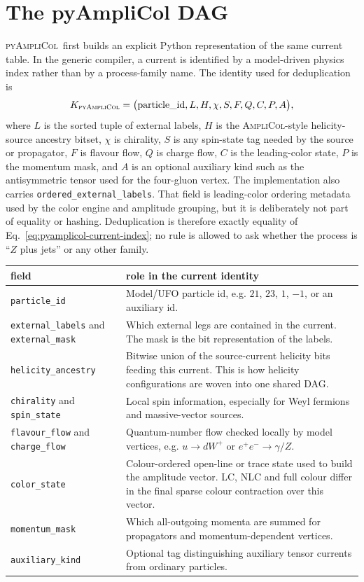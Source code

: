 \documentclass[10pt]{article}
\newcommand{\AC}{\textsc{AmpliCol}}
\newcommand{\PAC}{\textsc{pyAmpliCol}}
\begin{document}
\section{The pyAmpliCol DAG}

\PAC\ first builds an explicit Python representation of the same current table.
In the generic compiler, a current is identified by a model-driven physics
index rather than by a process-family name.  The identity used for
deduplication is
\begin{equation}
  K_{\PAC} =
  \bigl(
    \mathrm{particle\_id}, L, H, \chi, S, F, Q, C, P, A
  \bigr),
  \label{eq:pyamplicol-current-index}
\end{equation}
where $L$ is the sorted tuple of external labels, $H$ is the
\AC-style helicity-source ancestry bitset, $\chi$ is chirality, $S$ is any
spin-state tag needed by the source or propagator, $F$ is flavour flow, $Q$ is
charge flow, $C$ is the leading-color state, $P$ is the momentum mask, and $A$
is an optional auxiliary kind such as the antisymmetric tensor used for the
four-gluon vertex.  The implementation also carries
\texttt{ordered\_external\_labels}.  That field is leading-color ordering
metadata used by the color engine and amplitude grouping, but it is deliberately
not part of equality or hashing.  Deduplication is therefore exactly equality
of Eq.~\eqref{eq:pyamplicol-current-index}; no rule is allowed to ask whether
the process is ``$Z$ plus jets'' or any other family.

\begin{center}
\begin{tabular}{@{}L{1.45in}L{4.95in}@{}}
\toprule
\textbf{field} & \textbf{role in the current identity} \\
\midrule
\texttt{particle\_id} & Model/UFO particle id, e.g. $21$, $23$, $1$, $-1$, or an auxiliary id. \\
\texttt{external\_labels} and \texttt{external\_mask} & Which external legs are contained in the current.  The mask is the bit representation of the labels. \\
\texttt{helicity\_ancestry} & Bitwise union of the source-current helicity bits feeding this current.  This is how helicity configurations are woven into one shared DAG. \\
\texttt{chirality} and \texttt{spin\_state} & Local spin information, especially for Weyl fermions and massive-vector sources. \\
\texttt{flavour\_flow} and \texttt{charge\_flow} & Quantum-number flow checked locally by model vertices, e.g. $u\to d W^+$ or $e^+e^-\to\gamma/Z$. \\
\texttt{color\_state} & Colour-ordered open-line or trace state used to build the amplitude vector.  LC, NLC and full colour differ in the final sparse colour contraction over this vector. \\
\texttt{momentum\_mask} & Which all-outgoing momenta are summed for propagators and momentum-dependent vertices. \\
\texttt{auxiliary\_kind} & Optional tag distinguishing auxiliary tensor currents from ordinary particles. \\
\bottomrule
\end{tabular}
\end{center}
\end{document}
